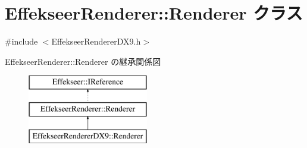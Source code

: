 \hypertarget{class_effekseer_renderer_1_1_renderer}{}\section{Effekseer\+Renderer\+:\+:Renderer クラス}
\label{class_effekseer_renderer_1_1_renderer}


{\ttfamily \#include $<$Effekseer\+Renderer\+D\+X9.\+h$>$}

Effekseer\+Renderer\+:\+:Renderer の継承関係図\begin{figure}[H]
\begin{center}
\leavevmode
\includegraphics[height=3.000000cm]{class_effekseer_renderer_1_1_renderer}
\end{center}
\end{figure}

